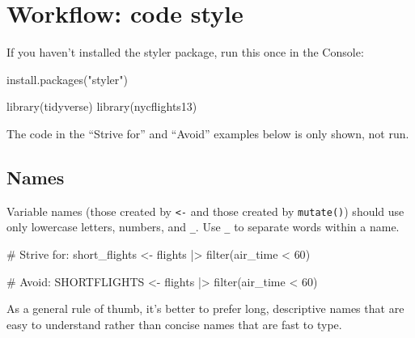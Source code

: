 \documentclass[
  letterpaper,
  DIV=11,
  numbers=noendperiod]{scrreprt}
\newenvironment{Shaded}{\begin{snugshade}}{\end{snugshade}}
\newcommand{\CommentTok}[1]{\textcolor[rgb]{0.37,0.37,0.37}{#1}}
\newcommand{\DecValTok}[1]{\textcolor[rgb]{0.68,0.00,0.00}{#1}}
\newcommand{\FunctionTok}[1]{\textcolor[rgb]{0.28,0.35,0.67}{#1}}
\newcommand{\NormalTok}[1]{\textcolor[rgb]{0.00,0.23,0.31}{#1}}
\newcommand{\OtherTok}[1]{\textcolor[rgb]{0.00,0.23,0.31}{#1}}
\newcommand{\SpecialCharTok}[1]{\textcolor[rgb]{0.37,0.37,0.37}{#1}}
\newcommand{\StringTok}[1]{\textcolor[rgb]{0.13,0.47,0.30}{#1}}
\begin{document}

\chapter{Workflow: code style}\label{sec-code-style}

If you haven't installed the styler package, run this once in the
Console:

\begin{Shaded}
\begin{Highlighting}[]
\FunctionTok{install.packages}\NormalTok{(}\StringTok{"styler"}\NormalTok{)}
\end{Highlighting}
\end{Shaded}

\begin{Shaded}
\begin{Highlighting}[]
\FunctionTok{library}\NormalTok{(tidyverse)}
\FunctionTok{library}\NormalTok{(nycflights13)}
\end{Highlighting}
\end{Shaded}

The code in the ``Strive for'' and ``Avoid'' examples below is only
shown, not run.

\section{Names}\label{names}

Variable names (those created by \texttt{\textless{}-} and those created
by \texttt{mutate()}) should use only lowercase letters, numbers, and
\texttt{\_}. Use \texttt{\_} to separate words within a name.

\begin{Shaded}
\begin{Highlighting}[]
\CommentTok{\# Strive for:}
\NormalTok{short\_flights }\OtherTok{\textless{}{-}}\NormalTok{ flights }\SpecialCharTok{|\textgreater{}}
  \FunctionTok{filter}\NormalTok{(air\_time }\SpecialCharTok{\textless{}} \DecValTok{60}\NormalTok{)}

\CommentTok{\# Avoid:}
\NormalTok{SHORTFLIGHTS }\OtherTok{\textless{}{-}}\NormalTok{ flights }\SpecialCharTok{|\textgreater{}}
  \FunctionTok{filter}\NormalTok{(air\_time }\SpecialCharTok{\textless{}} \DecValTok{60}\NormalTok{)}
\end{Highlighting}
\end{Shaded}

As a general rule of thumb, it's better to prefer long, descriptive
names that are easy to understand rather than concise names that are
fast to type.
\end{document}
